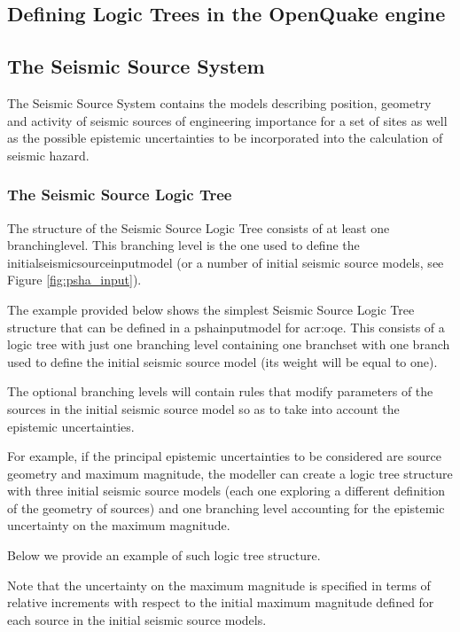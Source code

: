 \subsection{Defining Logic Trees in the OpenQuake engine}

\subsection{The Seismic Source System}
The Seismic Source System contains the models describing position, geometry 
and activity of seismic sources of engineering importance for a set of sites
as well as the possible epistemic uncertainties to be incorporated into the 
calculation of seismic hazard.
%
\subsubsection{The Seismic Source Logic Tree}
The structure of the Seismic Source Logic Tree consists of at least one 
\gls{branchinglevel}. This branching level is the one used to define the 
\gls{initialseismicsourceinputmodel} (or a number of initial seismic source 
models, see Figure \ref{fig:psha_input}). 

The example provided below shows the simplest Seismic Source Logic Tree 
structure that can be defined in a \gls{pshainputmodel} for \gls{acr:oqe}. 
This consists of a logic tree with just one branching level containing 
one \gls{branchset} with one branch used to define the initial seismic source 
model (its weight will be equal to one).


The optional branching levels will contain rules that modify parameters 
of the sources in the initial seismic source model so as to 
take into account the epistemic uncertainties. 

For example, if the principal epistemic uncertainties to be considered are
source geometry and maximum magnitude, the modeller can create a logic tree
structure with three initial seismic source models (each one exploring a 
different definition of the geometry of sources) and one branching level 
accounting for the epistemic uncertainty on the maximum magnitude.
 
Below we provide an example of such logic tree structure.

Note that the uncertainty on the maximum magnitude is specified in terms 
of relative increments with respect to the initial maximum magnitude 
defined for each source in the initial seismic source models.
%

